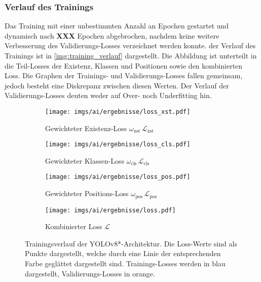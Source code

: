 \subsubsection{Verlauf des Trainings}

Das Training mit einer unbestimmten Anzahl an Epochen gestartet und dynamisch nach \textbf{XXX} Epochen abgebrochen, nachdem keine weitere Verbesserung des Validierungs-Losses verzeichnet werden konnte. der Verlauf des Trainings ist in \autoref{img:training_verlauf} dargestellt. Die Abbildung ist unterteilt in die Teil-Losses der Existenz, Klassen und Positionen sowie den kombinierten Loss. Die Graphen der Trainings- und Validierungs-Losses fallen gemeinsam, jedoch besteht eine Diskrepanz zwischen diesen Werten. Der Verlauf der Validierungs-Losses deuten weder auf Over- noch Underfitting hin.

\begin{figure}
    \centering
    \begin{subfigure}{\linewidth}
        \raggedleft
        \texttt{[image: imgs/ai/ergebnisse/loss\_xst.pdf]}
        \hspace{2.3cm}
        \caption{Gewichteter Existenz-Loss $\omega_\text{xst}\,\mathcal{L}_\text{xst}$}
    \end{subfigure}
    \vspace{0.1cm}
    \par

    \begin{subfigure}{\linewidth}
        \raggedleft
        \texttt{[image: imgs/ai/ergebnisse/loss\_cls.pdf]}
        \hspace{2.3cm}
        \caption{Gewichteter Klassen-Loss $\omega_\text{cls}\,\mathcal{L}_\text{cls}$}
    \end{subfigure}
    \vspace{0.1cm}
    \par

    \begin{subfigure}{\linewidth}
        \raggedleft
        \texttt{[image: imgs/ai/ergebnisse/loss\_pos.pdf]}
        \hspace{2.3cm}
        \caption{Gewichteter Positions-Loss $\omega_\text{pos}\,\mathcal{L}_\text{pos}$}
    \end{subfigure}
    \vspace{0.1cm}
    \par

    \begin{subfigure}{\linewidth}
        \raggedleft
        \texttt{[image: imgs/ai/ergebnisse/loss.pdf]}
        \hspace{2.3cm}
        \caption{Kombinierter Loss $\mathcal{L}$}
    \end{subfigure}

    \caption{Trainingsverlauf der YOLOv8*-Architektur. Die Loss-Werte sind als Punkte dargestellt, welche durch eine Linie der entsprechenden Farbe geglättet dargestellt sind. Trainings-Losses werden in blau dargestellt, Validierungs-Losses in orange.}
    \label{img:training_verlauf}
\end{figure}
